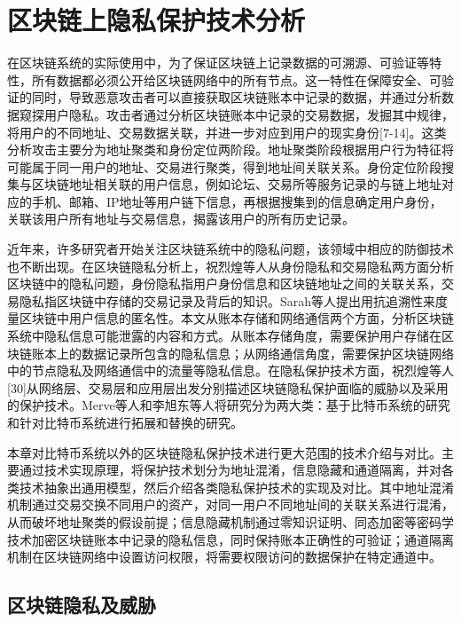 
\chapter{区块链上隐私保护技术分析}
\label{chap:privacy}

在区块链系统的实际使用中，为了保证区块链上记录数据的可溯源、可验证等特性，所有数据都必须公开给区块链网络中的所有节点。这一特性在保障安全、可验证的同时，导致恶意攻击者可以直接获取区块链账本中记录的数据，并通过分析数据窥探用户隐私。攻击者通过分析区块链账本中记录的交易数据，发掘其中规律，将用户的不同地址、交易数据关联，并进一步对应到用户的现实身份[7-14]。这类分析攻击主要分为地址聚类和身份定位两阶段。地址聚类阶段根据用户行为特征将可能属于同一用户的地址、交易进行聚类，得到地址间关联关系。身份定位阶段搜集与区块链地址相关联的用户信息，例如论坛、交易所等服务记录的与链上地址对应的手机、邮箱、IP地址等用户链下信息，再根据搜集到的信息确定用户身份，关联该用户所有地址与交易信息，揭露该用户的所有历史记录。

近年来，许多研究者开始关注区块链系统中的隐私问题，该领域中相应的防御技术也不断出现。在区块链隐私分析上，祝烈煌等人从身份隐私和交易隐私两方面分析区块链中的隐私问题，身份隐私指用户身份信息和区块链地址之间的关联关系，交易隐私指区块链中存储的交易记录及背后的知识。Sarah等人提出用抗追溯性来度量区块链中用户信息的匿名性。本文从账本存储和网络通信两个方面，分析区块链系统中隐私信息可能泄露的内容和方式。从账本存储角度，需要保护用户存储在区块链账本上的数据记录所包含的隐私信息；从网络通信角度，需要保护区块链网络中的节点隐私及网络通信中的流量等隐私信息。在隐私保护技术方面，祝烈煌等人[30]从网络层、交易层和应用层出发分别描述区块链隐私保护面临的威胁以及采用的保护技术。Merve等人和李旭东等人将研究分为两大类：基于比特币系统的研究和针对比特币系统进行拓展和替换的研究。

本章对比特币系统以外的区块链隐私保护技术进行更大范围的技术介绍与对比。主要通过技术实现原理，将保护技术划分为地址混淆，信息隐藏和通道隔离，并对各类技术抽象出通用模型，然后介绍各类隐私保护技术的实现及对比。其中地址混淆机制通过交易交换不同用户的资产，对同一用户不同地址间的关联关系进行混淆，从而破坏地址聚类的假设前提；信息隐藏机制通过零知识证明、同态加密等密码学技术加密区块链账本中记录的隐私信息，同时保持账本正确性的可验证；通道隔离机制在区块链网络中设置访问权限，将需要权限访问的数据保护在特定通道中。

\section{区块链隐私及威胁}

